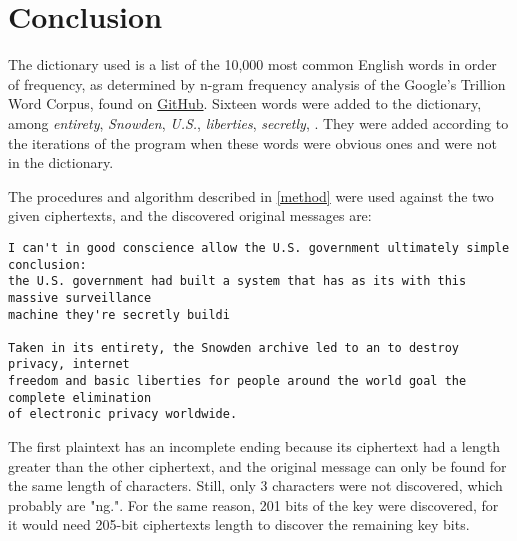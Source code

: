 \documentclass[a4paper,11pt]{article}
\begin{document}
\section{Conclusion}
\hspace{14pt}

The dictionary used is a list of the 10,000 most common English words in order of
frequency, as determined by n-gram frequency analysis of the Google's Trillion
Word Corpus, found on \href{https://github.com/first20hours/google-10000-english}{GitHub}.
Sixteen words were added to the dictionary, among \textit{entirety}, \textit{Snowden},
\textit{U.S.}, \textit{liberties}, \textit{secretly}, . They were added according
to the iterations of the program when these words were obvious ones and were not
in the dictionary.

The procedures and algorithm described in \ref{method} were used against the two
given ciphertexts, and the discovered original messages are:

\begin{verbatim}
I can't in good conscience allow the U.S. government ultimately simple conclusion:
the U.S. government had built a system that has as its with this massive surveillance
machine they're secretly buildi

Taken in its entirety, the Snowden archive led to an to destroy privacy, internet
freedom and basic liberties for people around the world goal the complete elimination
of electronic privacy worldwide.
\end{verbatim}

The first plaintext has an incomplete ending because its ciphertext had a length
greater than the other ciphertext, and the original message can only be found for
the same length of characters. Still, only 3 characters were not discovered, which
probably are "ng.". For the same reason, 201 bits of the key were discovered, for
it would need 205-bit ciphertexts length to discover the remaining key bits.
\end{document}
